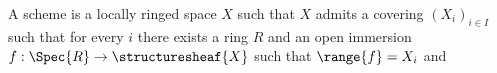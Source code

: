 %
%
\begin{structure}
   A scheme is a locally ringed space $X$ such that
   $X$ admits a covering $(X_i)_{i ∈ I}$ such that
   for every $i$ there exists a ring $R$
   and an open immersion $f : \Spec{R}\to\structuresheaf{X}$ such that
   $\range{f} = X_i$ and $$

\end{structure}
